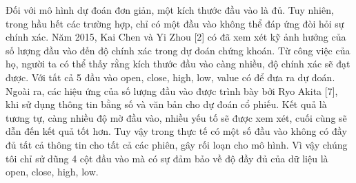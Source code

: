 Đối với mô hình dự đoán đơn giản, một kích thước đầu vào là đủ.
Tuy nhiên, trong hầu hết các trường hợp, chỉ có một đầu vào không thể đáp ứng
đòi hỏi sự chính xác. Năm 2015, Kai Chen và Yi Zhou [2] có
đã xem xét kỹ ảnh hưởng của số lượng đầu vào đến độ chính xác
trong dự đoán chứng khoán. Từ công việc của họ, người ta có thể thấy rằng
kích thước đầu vào càng nhiều, độ chính xác sẽ đạt được. Với tất cả 5
đầu vào open, close, high, low, value có để đưa ra dự đoán. Ngoài ra, các hiệu ứng của số lượng đầu vào được trình bày bởi Ryo Akita [7], khi sử dụng thông tin bằng số và văn bản cho
dự đoán cổ phiếu. Kết quả là tương tự, càng nhiều độ mờ đầu vào, nhiều yếu tố sẽ được xem xét, cuối cùng sẽ
dẫn đến kết quả tốt hơn. Tuy vậy trong thực tế có một số đầu vào không có đầy đủ tất cả thông tin cho tất cả các phiên, gây rối loạn cho mô hình. Vì vậy chúng tôi chỉ sử dũng 4 cột đầu vào mà có sự đảm bảo về độ đầy đủ của dữ liệu là open, close, high, low.